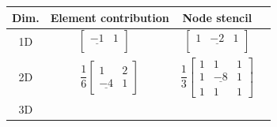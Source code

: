 \begin{table}
  \centering
  \begin{tabular}{|c|c|c|c}
      \hline
      Dim. & Element contribution & Node stencil\\
      \hline
      1D &
  \begin{minipage}{4cm}
    \begin{equation*}
       \left[\begin{array}{ccc}
          \underline{-1} & 1\\
      \end{array}\right] \quad 
    \end{equation*}
  \end{minipage} 
      &
  \begin{minipage}{4cm}
    \begin{equation*}
      \left[\begin{array}{ccc}
          1 & \underline{-2} & 1\\
      \end{array}\right]
    \end{equation*}
  \end{minipage} 
       \\[4mm]
       \hline
      2D &
  \begin{minipage}{5cm}
    \begin{equation*}
      \dfrac16\left[
        \begin{array}{ccc}
          1 & 2 \\
          \underline{-4} & 1
        \end{array}
      \right]
    \end{equation*}
  \end{minipage}  &
  \begin{minipage}{5cm}
    \begin{equation*}
        \dfrac13\left[
          \begin{array}{ccc}
            1 & 1 & 1\\
            1 & \underline{-8} & 1 \\
            1 & 1 & 1
          \end{array}
        \right]
    \end{equation*}
  \end{minipage}  \\[4mm]
      \hline
      3D &
  \begin{minipage}{6cm}
    \begin{equation*}
      \begin{array}{ll}

\end{array}
\end{equation*}
\end{minipage}
\end{tabular}
\end{table}
